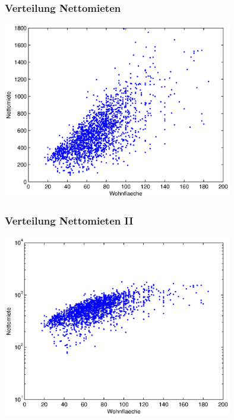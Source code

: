 \documentclass{beamer}
\begin{document}
\begin{frame}
  \frametitle{Verteilung Nettomieten}
  \begin{center}
    \includegraphics[width=10cm]{figures/nm_wfl_distribution}
  \end{center}
\end{frame}

\begin{frame}
  \frametitle{Verteilung Nettomieten II}
  \begin{center}
    \includegraphics[width=10cm]{figures/nm_wfl_distribution_log}
  \end{center}
\end{frame}
\end{document}
